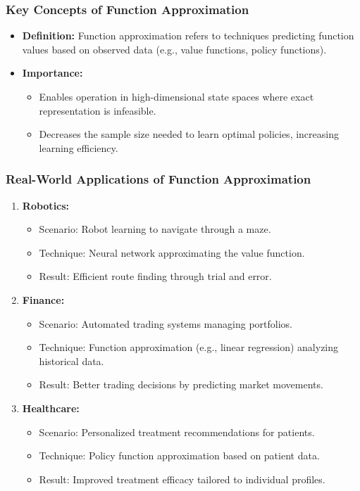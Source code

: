 \documentclass[aspectratio=169]{beamer}
\begin{document}
\begin{frame}[fragile]
    \frametitle{Key Concepts of Function Approximation}
    \begin{itemize}
        \item \textbf{Definition:} 
        Function approximation refers to techniques predicting function values based on observed data (e.g., value functions, policy functions).
        
        \item \textbf{Importance:}
        \begin{itemize}
            \item Enables operation in high-dimensional state spaces where exact representation is infeasible.
            \item Decreases the sample size needed to learn optimal policies, increasing learning efficiency.
        \end{itemize}
    \end{itemize}
\end{frame}

\begin{frame}[fragile]
    \frametitle{Real-World Applications of Function Approximation}
    \begin{enumerate}
        \item \textbf{Robotics:}
        \begin{itemize}
            \item Scenario: Robot learning to navigate through a maze.
            \item Technique: Neural network approximating the value function.
            \item Result: Efficient route finding through trial and error.
        \end{itemize}

        \item \textbf{Finance:}
        \begin{itemize}
            \item Scenario: Automated trading systems managing portfolios.
            \item Technique: Function approximation (e.g., linear regression) analyzing historical data.
            \item Result: Better trading decisions by predicting market movements.
        \end{itemize}

        \item \textbf{Healthcare:}
        \begin{itemize}
            \item Scenario: Personalized treatment recommendations for patients.
            \item Technique: Policy function approximation based on patient data.
            \item Result: Improved treatment efficacy tailored to individual profiles.
        \end{itemize}
    \end{enumerate}
\end{frame}
\end{document}
